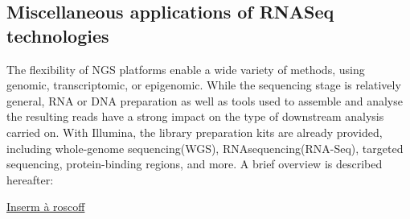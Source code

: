 \subsection{Miscellaneous applications of RNASeq technologies}
\label{subsec:miscelleanous-innovative-rna-seq}

The flexibility of NGS platforms enable a wide variety of methods, using genomic, transcriptomic, or epigenomic. While the sequencing stage is relatively general, RNA or DNA preparation as well as tools used to assemble and analyse the resulting reads have a strong impact on the type of downstream analysis carried on. With Illumina, the library preparation kits are already provided, including whole-genome sequencing(WGS), RNAsequencing(RNA-Seq), targeted sequencing, protein-binding regions, and more. A brief overview is described hereafter:


\href{https://ifb-elixirfr.github.io/EBAII/}{Inserm à roscoff} 

